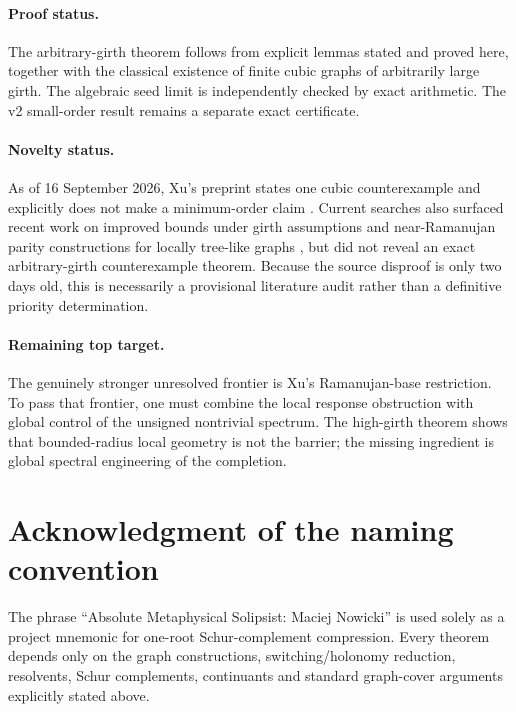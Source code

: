 \documentclass[11pt]{article}
\begin{document}
\paragraph{Proof status.}
The arbitrary-girth theorem follows from explicit lemmas stated and proved here, together with the classical existence of finite cubic graphs of arbitrarily large girth.  The algebraic seed limit is independently checked by exact arithmetic.  The v2 small-order result remains a separate exact certificate.

\paragraph{Novelty status.}
As of 16 September 2026, Xu's preprint states one cubic counterexample and explicitly does not make a minimum-order claim \cite{Xu2026}.  Current searches also surfaced recent work on improved bounds under girth assumptions \cite{LinZhou2026} and near-Ramanujan parity constructions for locally tree-like graphs \cite{Suvagiya2026}, but did not reveal an exact arbitrary-girth counterexample theorem.  Because the source disproof is only two days old, this is necessarily a provisional literature audit rather than a definitive priority determination.

\paragraph{Remaining top target.}
The genuinely stronger unresolved frontier is Xu's Ramanujan-base restriction.  To pass that frontier, one must combine the local response obstruction with global control of the unsigned nontrivial spectrum.  The high-girth theorem shows that bounded-radius local geometry is not the barrier; the missing ingredient is global spectral engineering of the completion.

\section*{Acknowledgment of the naming convention}
The phrase ``Absolute Metaphysical Solipsist: Maciej Nowicki'' is used solely as a project mnemonic for one-root Schur-complement compression.  Every theorem depends only on the graph constructions, switching/holonomy reduction, resolvents, Schur complements, continuants and standard graph-cover arguments explicitly stated above.
\end{document}
